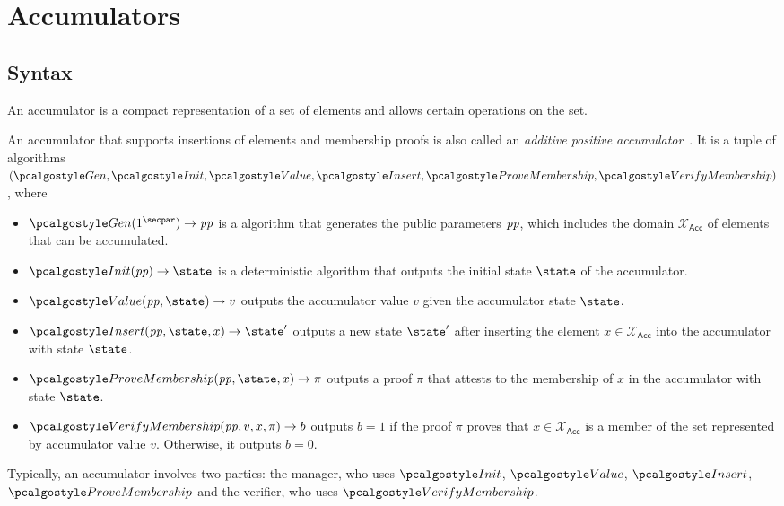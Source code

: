 \section{Accumulators}\label{sec:accumulators}

\subsection{Syntax}

An accumulator is a compact representation of a set of elements and allows certain operations on the set.

\begin{definition}[Accumulator]\label{def:accumulator}
An accumulator that supports insertions of elements and membership proofs is also called an \emph{additive positive accumulator}~\cite{RSA:BalCanYak20}.
It is a tuple of \ppt algorithms $(\algo{Gen}, \algo{Init}, \algo{Value}, \algo{Insert}, \algo{ProveMembership}, \algo{VerifyMembership})$, where

\begin{itemize}
    \item $\algo{Gen}(1^\secpar)\rightarrow \params$ is a \ppt algorithm that generates the public parameters $\mathit{pp}$, which includes the domain $\mathcal{X}_\mathsf{Acc}$ of elements that can be accumulated.
    \item $\algo{Init}(\params)\rightarrow \state$ is a deterministic algorithm that outputs the initial state $\state$ of the accumulator.
    \item $\algo{Value}(\params, \state)\rightarrow v$ outputs the accumulator value $v$ given the accumulator state $\state$.
    \item $\algo{Insert}(\params, \state, x) \rightarrow \state'$ outputs a new state $\state'$ after inserting the element $x \in \mathcal{X}_\mathsf{Acc}$ into the accumulator with state $\state$.
    \item $\algo{ProveMembership}(\params, \state, x) \rightarrow \pi$ outputs a proof $\pi$ that attests to the membership of $x$ in the accumulator with state $\state$.
    \item $\algo{VerifyMembership}(\params, v, x, \pi) \rightarrow b$ outputs $b = 1$ if the proof $\pi$ proves that $x \in \mathcal{X}_\mathsf{Acc}$ is a member of the set represented by accumulator value $v$. Otherwise, it outputs $b = 0$.
\end{itemize}
\end{definition}

Typically, an accumulator involves two parties: the manager, who uses $\algo{Init}$, $\algo{Value}$, $\algo{Insert}$, $\algo{ProveMembership}$ and the verifier, who uses $\algo{VerifyMembership}$.

